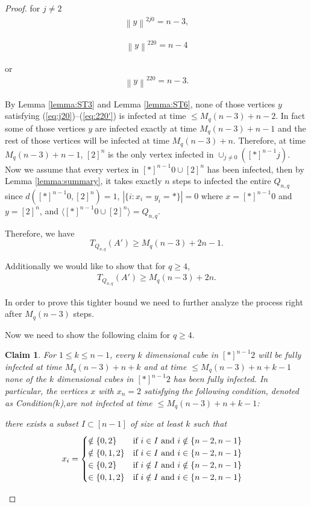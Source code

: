 \documentclass[reqno,11pt]{amsart}
\newtheorem{claim}[theorem]{Claim}
\renewcommand{\leq}{\leqslant}
\renewcommand{\geq}{\geqslant}
\begin{document}
\begin{proof}
for $j \neq 2$
\begin{align}\label{eq:2j0}
    \left \lVert y \right \rVert^{2j0}= n-3,
\end{align}

 \begin{align} \label{eq:220}
\left \lVert y \right \rVert^{220}= n-4 
 \end{align}

or 
\begin{align} \label{eq:220'}
    \left \lVert y \right \rVert^{220}=n-3.
\end{align}
 

By Lemma \ref{lemma:ST3} and Lemma \ref{lemma:ST6}, none of those vertices $y$ satisfying (\ref{eq:j20})--(\ref{eq:220'}) is infected at time $ \leq M_q(n-3)+n-2$. In fact some of those vertices $y$ are infected exactly at time $M_q(n-3)+n-1$ and the rest of those vertices will be infected at time $M_q(n-3)+n$. Therefore, at time $M_q(n-3)+n-1$, $[2]^n$ is the only vertex infected in $\cup_{j \neq 0} ([\ast]^{n-1}j)$. Now we assume that every vertex in $[\ast]^{n-1}0 \cup [2]^n$ has been infected, then by Lemma \ref{lemma:summary}, it takes exactly $n$ steps to infected the entire $Q_{n,q}$ since $d([\ast]^{n-1}0,[2]^n)=1$, $|\{i:x_i =y_i=\ast\}|=0$ where $x=[\ast]^{n-1}0$ and $y=[2]^n$, and $\langle[\ast]^{n-1}0 \cup [2]^n \rangle=Q_{n,q}$.

Therefore, we have 
$$T_{Q_{n,q}}(A') \geq M_q(n-3)+2n-1.$$

Additionally we would like to show that for $q \geq 4$,
\begin{align}\label{eq:T(Qn)}
    T_{Q_{n,q}}(A') \geq M_q(n-3)+2n.
\end{align} 

In order to prove this tighter bound we need to further analyze the process right after $M_q(n-3)$ steps.

Now we need to show the following claim for $q \geq 4$. 
\begin{claim} \label{claim:subset I}
    For $ 1 \leq k \leq n-1$, every $k$ dimensional cube in $[\ast]^{n-1}2$ will be fully infected at time $M_q(n-3)+n+k$ and at time $\leq M_q(n-3)+n+k-1$ none of the $k$ dimensional cubes in $[\ast]^{n-1}2$ has been fully infected. In particular, the vertices $x$ with $x_n=2$ satisfying the following condition, denoted as Condition($k$),are not infected at time  $\leq M_q(n-3)+n+k-1$:
    
     there exists a subset $I \subset [n-1]$ of size at least $k$ such that 
\begin{align*}
x_i &=\begin{cases} 
  \notin \{0,2\}& \text{if $i \in I$ and $i \notin \{n-2,n-1\}$} \\
   \notin \{0,1,2\} & \text{if $i \in I$ and $ i \in \{n-2,n-1\}$} \\
   \in \{0,2\}& \text{if $i \notin I$ and $i \notin \{n-2,n-1\}$}\\
   \in \{0,1,2\} & \text{if $i \notin I$ and $i \in \{n-2,n-1\}$}
   \end{cases}
\end{align*}




\end{claim}
\end{proof}
\end{document}
